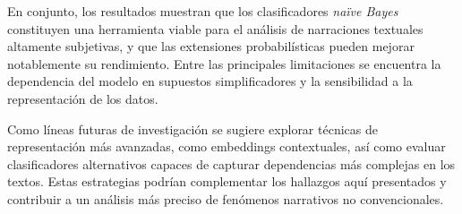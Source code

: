 \documentclass[eng]{ajceam-class}
\begin{document}
En conjunto, los resultados muestran que los clasificadores \textit{naïve Bayes} constituyen una herramienta viable para el análisis de narraciones textuales altamente subjetivas, y que las extensiones probabilísticas pueden mejorar notablemente su rendimiento. Entre las principales limitaciones se encuentra la dependencia del modelo en supuestos simplificadores y la sensibilidad a la representación de los datos.  

Como líneas futuras de investigación se sugiere explorar técnicas de representación más avanzadas, como embeddings contextuales\cite{scutari2010bnlearn}, así como evaluar clasificadores alternativos capaces de capturar dependencias más complejas en los textos. Estas estrategias podrían complementar los hallazgos aquí presentados y contribuir a un análisis más preciso de fenómenos narrativos no convencionales.  



\end{document}
